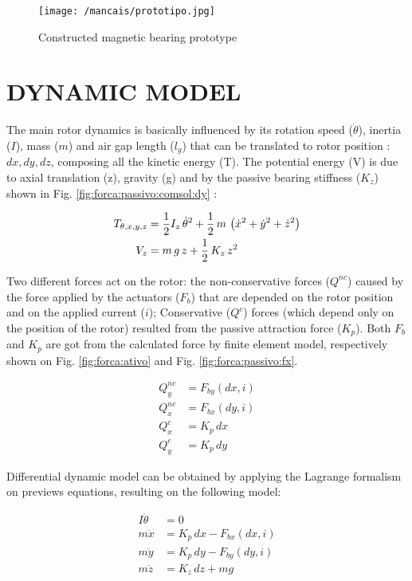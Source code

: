 \documentclass[10pt,fleqn,a4paper,twoside]{article}
\begin{document}
	\begin{figure}[ht]
	\centering
	\texttt{[image: /mancais/prototipo.jpg]}
	\caption{Constructed magnetic bearing prototype}
	\label{fig:prototipo}
	\end{figure}	
	
	\section{\uppercase{Dynamic Model}}

	The main rotor dynamics is basically influenced by its rotation speed ($\dot{\theta}$), inertia ($I$), mass ($m$) and air gap length ($l_g$) that can be  translated to rotor position : $dx,dy,dz$, composing all the kinetic energy (T). The potential energy (V) is due to axial translation (z), gravity (g) and by the passive bearing stiffness ($K_z$) shown in Fig. \ref{fig:forca:passivo:comsol:dy} : 
	
	\begin{align}
		T_{\theta, x, y, z} &= \frac{1}{2} I_z \, \dot{\theta}^2 + \frac{1}{2} \, m \, \left( \dot{x}^2 + \dot{y}^2 + \dot{z}^2 \right) \notag \\
		V_z &= m \, g \, z + \frac{1}{2} \, K_z \, z^2
	\end{align}	

	Two different forces act on the rotor: the  non-conservative forces ($Q^{nc}$) caused by the force applied by the actuators ($F_b$) that are depended on the rotor position and on the applied current ($i$); Conservative ($Q^{c}$) forces (which depend only on the position of the rotor) resulted from the passive attraction force ($K_p$). Both $F_b$ and $K_p$ are got from the calculated force by finite element model, respectively shown on Fig. \ref{fig:forca:ativo} and Fig. \ref{fig:forca:passivo:fx}.

	\begin{align}
		Q_y^{nc} &= F_{by}(dx,i)  \\
		Q_x^{nc} &= F_{bx}(dy,i)  \\
		Q^{c}_x  &= K_p \, dx \\
		Q^{c}_y  &= K_p \, dy 
	\end{align}
	
	Differential dynamic model can be obtained by applying the Lagrange formalism on previews equations, resulting on the following model:
			
	\begin{align}
		I \ddot{\theta} &= 0 \\
		m \ddot{x}		&= K_p \, dx  - F_{bx}(dx,i) \\
		m \ddot{y}		&= K_p \, dy  - F_{by}(dy,i)\\	
		m \ddot{z}  	&= K_z \, dz + m g 
	\end{align}
	
\end{document}
